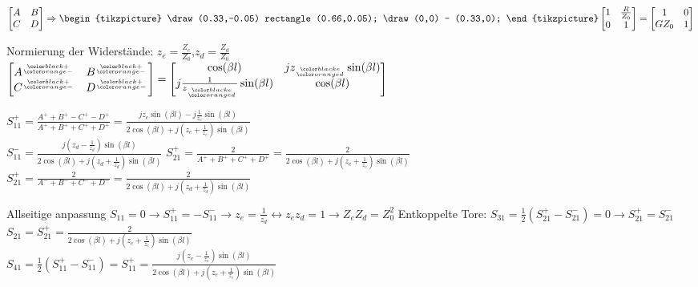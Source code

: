 $\begin{bmatrix}
    A & B \\ C & D
\end{bmatrix} \Rightarrow
\begin{tikzpicture}
    \draw (0.33,-0.05) rectangle (0.66,0.05);
    \draw (0,0) -- (0.33,0);
\end{tikzpicture}
\begin{bmatrix}
    1 & \frac{R}{Z_0} \\0 & 1
\end{bmatrix} = \begin{bmatrix}
    1 & 0 \\ GZ_0 & 1
\end{bmatrix}$

Normierung der Widerstände:
$z_e = \frac{Z_e}{Z_0}$,$z_d = \frac{Z_d}{Z_0}$ \\
$\begin{bmatrix}
    A^\ggt{+}{-} & B^\ggt{+}{-} \\ C^{\ggt{+}{-}} & D^{\ggt{+}{-}}
\end{bmatrix} = \begin{bmatrix}
    \cos(\beta l) & jz_{\ggt{e}{d}}\sin(\beta l) \\
    j\frac{1}{z_{\ggt{e}{d}}}\sin(\beta l) & \cos(\beta l)
\end{bmatrix}$

$S_{11}^+ = \frac{A^+ + B^+ - C^+ - D^+}{A^+ + B^+ + C^+ + D^+} = \frac{jz_e\sin(\beta l) -
    j\frac{1}{z_e}\sin(\beta l) }{2\cos(\beta l) + j(z_e + \frac{1}{z_e}) \sin(\beta l)}$\\

$S_{11}^- = \frac{j(z_d - \frac{1}{z_d})\sin(\beta l) }{2\cos(\beta l) + j(z_d + \frac{1}{z_d}) \sin(\beta l)}$
$S_{21}^+ = \frac{2}{A^+ + B^+ + C^+ + D^+} = \frac{2}{2\cos(\beta l) + j(z_e + \frac{1}{z_e}) \sin(\beta l)}$\\
$S_{21}^+ = \frac{2}{A^- + B^- + C^- + D^-} = \frac{2}{2\cos(\beta l) + j(z_d + \frac{1}{z_d}) \sin(\beta l)}$

Allseitige anpassung $S_{11} = 0 \rightarrow S_{11}^+ = - S_{11}^- \rightarrow z_e = \frac{1}{z_d} \leftrightarrow z_ez_d = 1 \rightarrow Z_eZ_d = Z_0^2$
Entkoppelte Tore: $S_{31} = \frac{1}{2}(S_{21}^+ - S_{21}^-) = 0 \rightarrow S_{21}^+ = S_{21}^-$
$S_{21} = S_{21}^+ = \frac{2}{2\cos(\beta l) + j(z_e + \frac{1}{z_e}) \sin(\beta l)}$\\
$S_{41} = \frac{1}{2}(S_{11}^+ - S_{11}^-) = S_{11}^+ = \frac{j(z_e - \frac{1}{z_e})\sin(\beta l) }{2\cos(\beta l) + j(z_e + \frac{1}{z_e}) \sin(\beta l)}$

